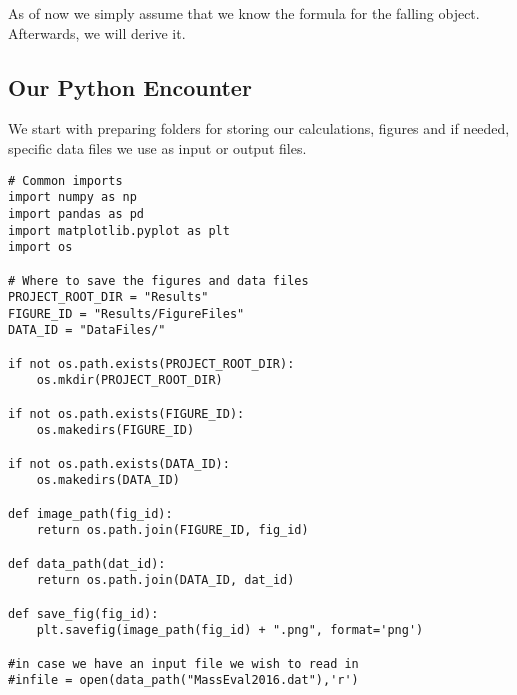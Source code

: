\documentclass[%
oneside,                 %
final,                   %
10pt]{article}
\begin{document}
As of now we simply assume that   we know the formula for the falling object. Afterwards, we will derive it.

\subsection*{Our Python Encounter}

We start with preparing folders for storing our calculations, figures and if needed, specific data files we use as input or output files.

































\begin{verbatim}
# Common imports
import numpy as np
import pandas as pd
import matplotlib.pyplot as plt
import os

# Where to save the figures and data files
PROJECT_ROOT_DIR = "Results"
FIGURE_ID = "Results/FigureFiles"
DATA_ID = "DataFiles/"

if not os.path.exists(PROJECT_ROOT_DIR):
    os.mkdir(PROJECT_ROOT_DIR)

if not os.path.exists(FIGURE_ID):
    os.makedirs(FIGURE_ID)

if not os.path.exists(DATA_ID):
    os.makedirs(DATA_ID)

def image_path(fig_id):
    return os.path.join(FIGURE_ID, fig_id)

def data_path(dat_id):
    return os.path.join(DATA_ID, dat_id)

def save_fig(fig_id):
    plt.savefig(image_path(fig_id) + ".png", format='png')

#in case we have an input file we wish to read in
#infile = open(data_path("MassEval2016.dat"),'r')

\end{verbatim}
\end{document}
